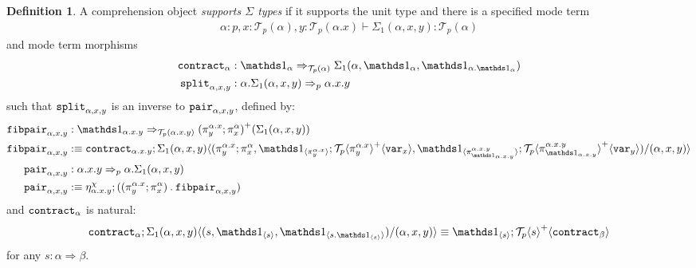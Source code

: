 \documentclass[10pt]{article}
\theoremstyle{definition}
\newtheorem{definition}{Definition}
\newcommand{\tcell}{\Rightarrow}
\newcommand\TrPlus[2]{\ensuremath{{#1}^+(#2)}}
\newcommand\El[2]{\mathcal{T}_{#1}(#2)}
\newcommand\ApEl[2]{\mathcal{T}_{#1}\langle#2\rangle}
\newcommand\bdot[0]{\mathbin{.}}
\newcommand\ap[2]{\ensuremath{#1 \langle #2 \rangle }}
\newcommand\ApPlus[2]{\ensuremath{{#1}^+ \langle #2 \rangle }}
\begin{document}
\begin{definition}\label{def:supports-sigmas}
A comprehension object \emph{supports $\Sigma$ types} if it supports the unit type and there is a specified mode term
\begin{align*}
\alpha : p, x : \El{p}{\alpha}, y : \El{p}{\alpha.x} \vdash \Sigma_1(\alpha,x,y) : \El{p}{\alpha}
\end{align*}
and mode term morphisms
\begin{align*}
\contract{\alpha} &: \One_\alpha \tcell_{\El{p}{\alpha}} \Sigma_1(\alpha,\One_\alpha,\One_{\alpha.{\One_\alpha}}) \\
\tsplit{\alpha,x,y} &: \alpha.\Sigma_1(\alpha,x,y) \tcell_{p} \alpha.x.y
\end{align*}
such that $\mathtt{split}_{\alpha,x,y}$ is an inverse to $\mathtt{pair}_{\alpha,x,y}$, defined by:
\begin{align*}
\fibpair{\alpha,x,y} &: \One_{\alpha.x.y} \tcell_{\El{p}{\alpha.x.y}} \TrPlus{(\pi^{\alpha.x}_y;\pi^\alpha_x)}{\Sigma_1(\alpha,x,y)} \\
\fibpair{\alpha,x,y} &:\equiv \contract{\alpha.x.y};\ap{\Sigma_1(\alpha,x,y)}{(\pi^{\alpha.x}_y;\pi^{\alpha}_x,\ApOne{\pi^{\alpha.x}_y};\ApPlus{\ApEl{p}{\pi^{\alpha.x}_y}}{\var{x}}, \ApOne{\pi^{\alpha.x.y}_{\One_{\alpha.x.y}}};\ApPlus{\ApEl{p}{\pi^{\alpha.x.y}_{\One_{\alpha.x.y}}}}{\var{y}})/(\alpha,x,y)} \\
\pair{\alpha,x,y} &: \alpha.x.y \tcell_{p} \alpha.\Sigma_1(\alpha,x,y) \\
\pair{\alpha, x, y} &:\equiv \eta^\chi_{\alpha.x.y};((\pi^{\alpha.x}_y;\pi^\alpha_x) \bdot \fibpair{\alpha,x,y})
\end{align*}
and $\mathtt{contract}_{\alpha}$ is natural:
\begin{align}
\contract{\alpha};\ap{\Sigma_1(\alpha,x,y)}{(s, \ApOne{s}, \ApOne{s \bdot \ApOne{s}})/(\alpha,x,y)} \equiv \ApOne{s};\ApPlus{\ApEl{p}{s}}{\contract{\beta}}
\end{align}
for any $s : \alpha \tcell \beta$.
\end{definition}
\end{document}
